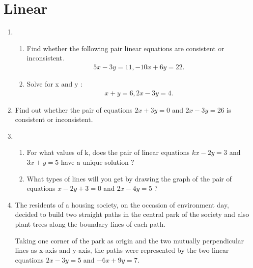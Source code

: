 \documentclass{article}
\begin{document}
\section*{\center Linear}
\begin{enumerate}
\item 
\begin{enumerate}
    \item Find whether the following pair linear equations are consistent or 
inconsistent.
\begin{align*}
        5x-3y=11, -10x+6y=22.
\end{align*}
    \item Solve for x and y :
\begin{align*}
     x+y=6, 2x-3y=4.
\end{align*}   
 \end{enumerate}
 \item Find out whether the pair of equations $2x+3y=0$ and $2x-3y=26$ is consistent or inconsistent.
\item 
\begin{enumerate}
    \item For what values of k, does the pair of linear equations $kx-2y=3$ and $3x+y=5$ have a unique solution ?
    \item What types of lines will you get by drawing the graph of the pair of equations $x-2y+3=0$ and $2x-4y=5$ ?
\end{enumerate}
\item The residents of a housing society, on the occasion of environment day, decided to build two straight paths in the central park of the society and also plant trees along the boundary lines of each path.

Taking one corner of the park as origin and the two mutually perpendicular lines as x-axis and y-axis, the paths were represented by the two linear equations $2x-3y=5$ and $-6x+9y=7$.


\end{enumerate}
\end{document}
